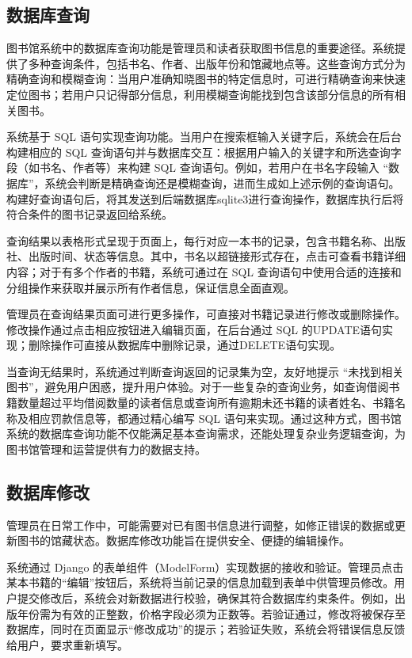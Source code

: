 \documentclass[a4paper,14pt]{article}
\begin{document}
\subsection{数据库查询} 
图书馆系统中的数据库查询功能是管理员和读者获取图书信息的重要途径。系统提供了多种查询条件，包括书名、作者、出版年份和馆藏地点等。这些查询方式分为精确查询和模糊查询：当用户准确知晓图书的特定信息时，可进行精确查询来快速定位图书；若用户只记得部分信息，利用模糊查询能找到包含该部分信息的所有相关图书。

系统基于 SQL 语句实现查询功能。当用户在搜索框输入关键字后，系统会在后台构建相应的 SQL 查询语句并与数据库交互：根据用户输入的关键字和所选查询字段（如书名、作者等）来构建 SQL 查询语句。例如，若用户在书名字段输入 “数据库”，系统会判断是精确查询还是模糊查询，进而生成如上述示例的查询语句。构建好查询语句后，将其发送到后端数据库sqlite3进行查询操作，数据库执行后将符合条件的图书记录返回给系统。

查询结果以表格形式呈现于页面上，每行对应一本书的记录，包含书籍名称、出版社、出版时间、状态等信息。其中，书名以超链接形式存在，点击可查看书籍详细内容；对于有多个作者的书籍，系统可通过在 SQL 查询语句中使用合适的连接和分组操作来获取并展示所有作者信息，保证信息全面直观。

管理员在查询结果页面可进行更多操作，可直接对书籍记录进行修改或删除操作。修改操作通过点击相应按钮进入编辑页面，在后台通过 SQL 的UPDATE语句实现；删除操作可直接从数据库中删除记录，通过DELETE语句实现。

当查询无结果时，系统通过判断查询返回的记录集为空，友好地提示 “未找到相关图书”，避免用户困惑，提升用户体验。对于一些复杂的查询业务，如查询借阅书籍数量超过平均借阅数量的读者信息或查询所有逾期未还书籍的读者姓名、书籍名称及相应罚款信息等，都通过精心编写 SQL 语句来实现。通过这种方式，图书馆系统的数据库查询功能不仅能满足基本查询需求，还能处理复杂业务逻辑查询，为图书馆管理和运营提供有力的数据支持。


\subsection{数据库修改} 管理员在日常工作中，可能需要对已有图书信息进行调整，如修正错误的数据或更新图书的馆藏状态。数据库修改功能旨在提供安全、便捷的编辑操作。

系统通过 Django 的表单组件（ModelForm）实现数据的接收和验证。管理员点击某本书籍的“编辑”按钮后，系统将当前记录的信息加载到表单中供管理员修改。用户提交修改后，系统会对新数据进行校验，确保其符合数据库约束条件。例如，出版年份需为有效的正整数，价格字段必须为正数等。若验证通过，修改将被保存至数据库，同时在页面显示“修改成功”的提示；若验证失败，系统会将错误信息反馈给用户，要求重新填写。
\end{document}

